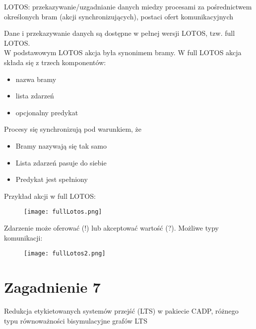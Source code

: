 \documentclass[a4paper,15pt]{article}
\newcommand{\issue}[2]{
    \begin{tcolorbox}[colback=issueColor!5!white,colframe=issueColor,title={Zagadnienie #1}]
        #2
    \end{tcolorbox}
}
\begin{document}
\issue{6}{
LOTOS: przekazywanie/uzgadnianie danych miedzy procesami za
pośrednictwem określonych bram (akcji synchronizujących), postaci ofert komunikacyjnych
}

Dane i przekazywanie danych są dostępne w pełnej wersji LOTOS, tzw. full LOTOS. \\ 
W podstawowym LOTOS akcja była synonimem bramy. W full LOTOS akcja składa się z trzech komponentów: 
\begin{itemize}
\item nazwa bramy
\item lista zdarzeń
\item opcjonalny predykat
\end{itemize}

Procesy się synchronizują pod warunkiem, że 
\begin{itemize}
\item Bramy nazywają się tak samo
\item Lista zdarzeń pasuje do siebie
\item Predykat jest spełniony
\end{itemize}

Przykład akcji w full LOTOS:\

\begin{figure}[H]
\centerline{\texttt{[image: fullLotos.png]}}
\end{figure}

Zdarzenie może oferować (!) lub akceptować wartość (?). 
Możliwe typy komunikacji: 

\begin{figure}[H]
\centerline{\texttt{[image: fullLotos2.png]}}
\end{figure}


\newpage
\section{Zagadnienie 7}

\issue{7}{
Redukcja etykietowanych systemów przejść (LTS) w pakiecie CADP, różnego typu równoważności bisymulacyjne grafów LTS
}
\end{document}
